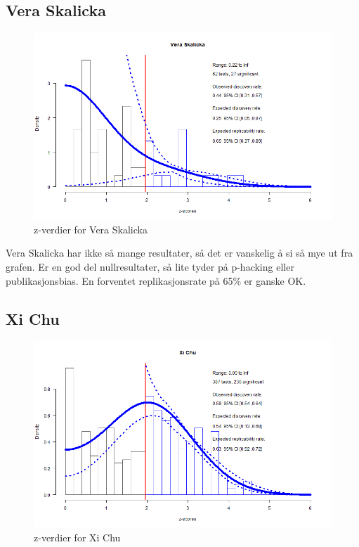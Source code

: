 \documentclass[doc,norsk]{apa7}
\begin{document}
\subsection{Vera Skalicka}
\begin{figure}[h!]
    \centering
    \includegraphics[width=\textwidth]{images/Vera Skalicka.png}
    \caption{z-verdier for Vera Skalicka}
\end{figure}

Vera Skalicka har ikke så mange resultater, så det er vanskelig å si så mye ut fra grafen. Er en god del nullresultater, så lite tyder på p-hacking eller publikasjonsbias. En forventet replikasjonsrate på 65\% er ganske OK.

\subsection{Xi Chu}
\begin{figure}[h!]
    \centering
    \includegraphics[width=\textwidth]{images/Xi Chu.png}
    \caption{z-verdier for Xi Chu}
\end{figure}
\end{document}
